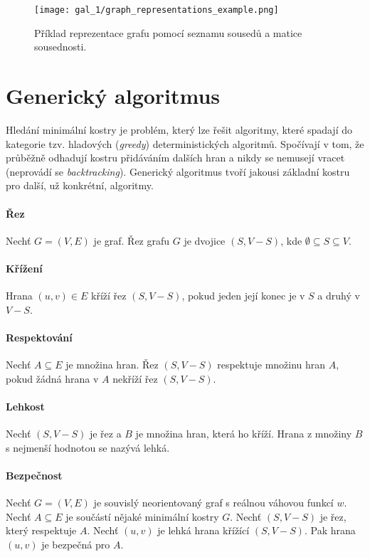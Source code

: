 \begin{figure}[H]
    \centering
    \texttt{[image: gal\_1/graph\_representations\_example.png]}
    \caption{Příklad reprezentace grafu pomocí seznamu sousedů a matice sousednosti.}
\end{figure}


\section{Generický algoritmus}

Hledání minimální kostry je problém, který lze řešit algoritmy, které spadají do kategorie tzv. hladových (\textit{greedy}) deterministických algoritmů. Spočívají v tom, že průběžně odhadují kostru přidáváním dalších hran a nikdy se nemusejí vracet (neprovádí se \textit{backtracking}). Generický algoritmus tvoří jakousi základní kostru pro další, už konkrétní, algoritmy.

\paragraph*{Řez} Nechť $G = (V, E)$ je graf. Řez grafu $G$ je dvojice $(S, V - S)$, kde $\emptyset \subseteq S \subseteq V$.

\paragraph*{Křížení} Hrana $(u, v) \in E$ kříží řez $(S, V - S)$, pokud jeden její konec je v $S$ a druhý v $V - S$.

\paragraph*{Respektování} Nechť $A \subseteq E$ je množina hran. Řez $(S, V - S)$ respektuje množinu hran $A$, pokud žádná hrana v $A$ nekříží řez $(S, V - S)$.

\paragraph*{Lehkost} Nechť $(S, V - S)$ je řez a $B$ je množina hran, která ho kříží. Hrana z množiny $B$ s nejmenší hodnotou se nazývá lehká.

\paragraph*{Bezpečnost} Nechť $G = (V, E)$ je souvislý neorientovaný graf s reálnou váhovou funkcí $w$. Nechť $A \subseteq E$ je součástí nějaké minimální kostry $G$. Nechť $(S, V - S)$ je řez, který respektuje $A$. Nechť $(u, v)$ je lehká hrana křížící $(S, V - S)$. Pak hrana $(u, v)$ je bezpečná pro $A$.

